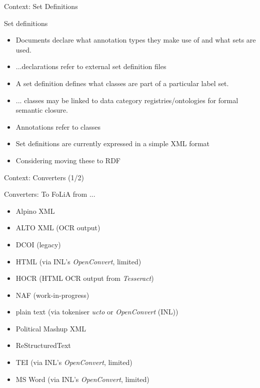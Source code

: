 \documentclass[xcolor=table,10pt,t]{beamer}
\begin{document}
\begin{frame}{Context: Set Definitions}
  \begin{block}{Set definitions}
        \begin{itemize}
            \item Documents declare what annotation types they make use of and
                what sets are used.
            \item ...declarations refer to external set definition files
            \item A set definition defines what classes are part of a
                particular label set.
            \item ... classes may be linked to data category
                registries/ontologies for formal semantic closure.
            \item Annotations refer to classes
        \end{itemize}

        \begin{itemize}
            \item Set definitions are currently expressed in a simple XML
                format
            \item Considering moving these to RDF
        \end{itemize}
  \end{block}
\end{frame}


\begin{frame}{Context: Converters (1/2)}
  \begin{block}{Converters: To FoLiA from ...}
      \begin{itemize}
          \item Alpino XML
          \item ALTO XML (OCR output)
          \item DCOI (legacy)
          \item HTML (via INL's \emph{OpenConvert}, limited)
          \item HOCR (HTML OCR output from \emph{Tesseract})
          \item NAF (work-in-progress)
          \item plain text (via tokeniser \emph{ucto} or
              \emph{OpenConvert} (INL))
          \item Political Mashup XML
          \item ReStructuredText
          \item TEI (via INL's \emph{OpenConvert}, limited)
          \item MS Word (via INL's \emph{OpenConvert}, limited)
      \end{itemize}
  \end{block}
\end{frame}
\end{document}
